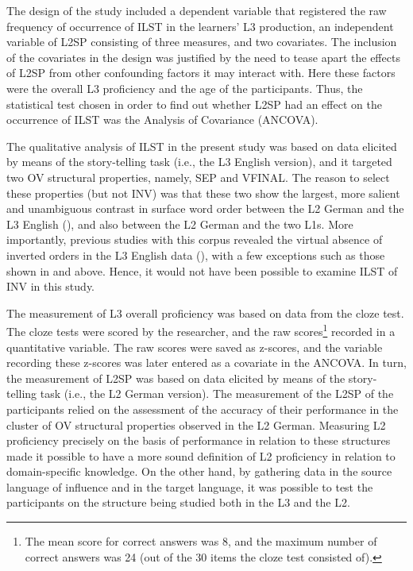 \documentclass[output=paper,modfonts,nonflat, newtxmath]{langsci/langscibook}
\begin{document}
The design of the study included a dependent variable that registered the raw frequency of occurrence of ILST in the learners’ L3 production, an independent variable of L2SP consisting of three measures, and two covariates. The inclusion of the covariates in the design was justified by the need to tease apart the effects of L2SP from other confounding factors it may interact with. Here these factors were the overall L3 proficiency and the age of the participants. Thus, the statistical test chosen in order to find out whether L2SP had an effect on the occurrence of ILST was the Analysis of Covariance (ANCOVA).

The qualitative analysis of ILST in the present study was based on data elicited by means of the story-telling task (i.e., the L3 English version), and it targeted two OV structural properties, namely, SEP and VFINAL. The reason to select these properties (but not INV) was that these two show the largest, more salient and unambiguous contrast in surface word order between the L2 German and the L3 English (\citealt[293]{Gawlitzek-MaiwaldTracy2005}), and also between the L2 German and the two L1s. More importantly, previous studies with this corpus revealed the virtual absence of inverted orders in the L3 English data (\citealt{Sánchez2010, Sánchez2011, Sánchez2012}), with a few exceptions such as those shown in  and  above. Hence, it would not have been possible to examine ILST of INV in this study.

The measurement of L3 overall proficiency was based on data from the cloze test. The cloze tests were scored by the researcher, and the raw scores\footnote{The mean score for correct answers was 8, and the maximum number of correct answers was 24 (out of the 30 items the cloze test consisted of).} recorded in a quantitative variable. The raw scores were saved as z-scores, and the variable recording these z-scores was later entered as a covariate in the ANCOVA. In turn, the measurement of L2SP was based on data elicited by means of the story-telling task (i.e., the L2 German version). The measurement of the L2SP of the participants relied on the assessment of the accuracy of their performance in the cluster of OV structural properties observed in the L2 German. Measuring L2 proficiency precisely on the basis of performance in relation to these structures made it possible to have a more sound definition of L2 proficiency in relation to domain-specific knowledge. On the other hand, by gathering data in the source language of influence and in the target language, it was possible to test the participants on the structure being studied both in the L3 and the L2.
\end{document}
